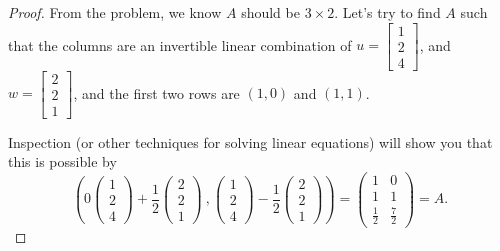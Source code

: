 \documentclass{article}
\theoremstyle{definition}
\begin{document}
\begin{proof} From the problem, we know $A$ should be $3 \times 2$.
	Let's try to find $A$ such that the columns are an invertible linear combination of $u = \begin{bmatrix} 1 \\ 2 \\ 4 \end{bmatrix}$, and $w=\begin{bmatrix} 2 \\ 2 \\ 1 \end{bmatrix}$, and the first two rows are $(1,0)$ and $(1,1)$.
	
	Inspection (or other techniques for solving linear equations) will show you that this is possible by
	\[\left(0 \begin{pmatrix} 1 \\ 2 \\ 4 \end{pmatrix} + \frac{1}{2} \begin{pmatrix} 2 \\ 2 \\ 1 \end{pmatrix} \ ,  \begin{pmatrix} 1 \\ 2 \\ 4 \end{pmatrix} - \frac{1}{2} \begin{pmatrix} 2 \\ 2 \\ 1 \end{pmatrix} \right) = \begin{pmatrix} 1 & 0 \\ 1 & 1 \\ \frac{1}{2} & \frac{7}{2} \end{pmatrix} = A. \]
	

\end{proof}
\end{document}
